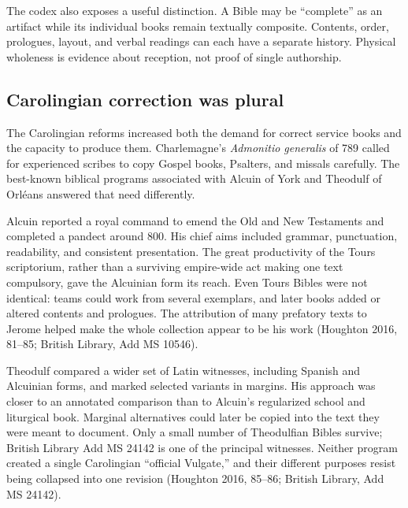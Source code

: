 The codex also exposes a useful distinction. A Bible may be ``complete'' as an artifact while its individual books remain textually composite. Contents, order, prologues, layout, and verbal readings can each have a separate history. Physical wholeness is evidence about reception, not proof of single authorship.

\subsection{Carolingian correction was plural}

The Carolingian reforms increased both the demand for correct service books and the capacity to produce them. Charlemagne's \emph{Admonitio generalis} of 789 called for experienced scribes to copy Gospel books, Psalters, and missals carefully. The best-known biblical programs associated with Alcuin of York and Theodulf of Orl\'eans answered that need differently.

Alcuin reported a royal command to emend the Old and New Testaments and completed a pandect around 800. His chief aims included grammar, punctuation, readability, and consistent presentation. The great productivity of the Tours scriptorium, rather than a surviving empire-wide act making one text compulsory, gave the Alcuinian form its reach. Even Tours Bibles were not identical: teams could work from several exemplars, and later books added or altered contents and prologues. The attribution of many prefatory texts to Jerome helped make the whole collection appear to be his work (Houghton 2016, 81--85; British Library, Add MS 10546).

Theodulf compared a wider set of Latin witnesses, including Spanish and Alcuinian forms, and marked selected variants in margins. His approach was closer to an annotated comparison than to Alcuin's regularized school and liturgical book. Marginal alternatives could later be copied into the text they were meant to document. Only a small number of Theodulfian Bibles survive; British Library Add MS 24142 is one of the principal witnesses. Neither program created a single Carolingian ``official Vulgate,'' and their different purposes resist being collapsed into one revision (Houghton 2016, 85--86; British Library, Add MS 24142).

